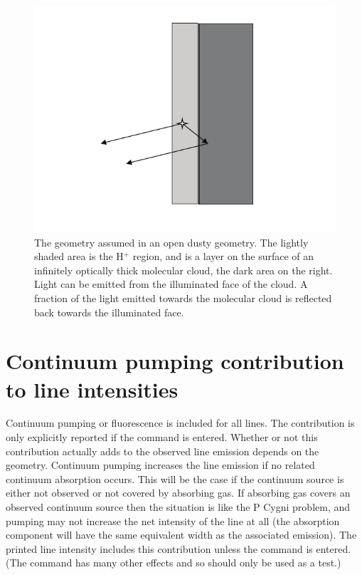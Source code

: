 \begin{figure}
\centering
\includegraphics[scale=0.8]{DustyOpenGeometry}
\caption[Dusty open geometry]{
\label{fig:DustyOpenGeometry}The geometry assumed
in an open dusty geometry.
The lightly
shaded area is the H$^+$ region,
and is a layer on the surface of an infinitely
optically thick molecular cloud, the dark area on the right.
Light can
be emitted from the illuminated face of the cloud.
A fraction of the light
emitted towards the molecular cloud is reflected back towards the illuminated face. }
\end{figure}

\section{Continuum pumping contribution to line intensities}

Continuum pumping or fluorescence is included for all lines.
The contribution is only explicitly reported if the
 command is entered.
Whether or not this contribution actually adds to the observed
line emission depends on the geometry.
Continuum pumping increases the
line emission if no related continuum absorption occurs.
This will be the
case if the continuum source is either not observed or not covered by
absorbing gas.
If absorbing gas covers an observed continuum source then
the situation is like the P Cygni problem, and pumping may not increase
the net intensity of the line at all (the absorption component will have
the same equivalent width as the associated emission).
The printed line
intensity includes this contribution unless the
 command is entered.
(The  command has many other effects and
so should only be used as a test.)

